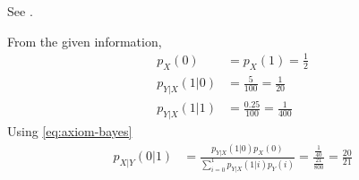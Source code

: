 See . 
\begin{table}[H]
\centering
	
	\caption{}
	\label{tab:ncert/12/13/6/3/table1}
\end{table}
From the given information,
\begin{align}
	\label{eq:ncert/12/13/6/3/eq1}
	p_X(0)&=p_X(1)=\frac{1}{2}\\
	p_{Y|X}(1|0)&=\frac{5}{100}
				=\frac{1}{20}\\
	p_{Y|X}(1|1)&=\frac{0.25}{100}
				=\frac{1}{400}
\end{align}
Using \eqref{eq:axiom-bayes}
\begin{align}
	p_{X|Y}(0|1)&=\frac{p_{Y|X}(1|0) p_X(0)}{\sum_{i=0}^{1}p_{Y|X}(1|i)p_Y(i)}
				=\frac{\frac{1}{40}}{\frac{21}{800}}
				=\frac{20}{21}
\end{align}
